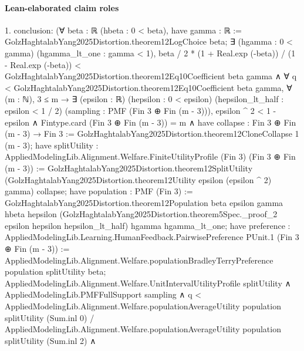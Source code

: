 \documentclass[10pt]{article}
\begin{document}
\paragraph{Lean-elaborated claim roles}\begin{ReviewVerbatim}
1. conclusion: (∀ {beta : ℝ} (hbeta : 0 < beta),
    have gamma : ℝ := GolzHaghtalabYang2025Distortion.theorem12LogChoice beta;
    ∃ (hgamma : 0 < gamma) (hgamma_lt_one : gamma < 1),
      beta / 2 * (1 + Real.exp (-beta)) / (1 - Real.exp (-beta)) <
          GolzHaghtalabYang2025Distortion.theorem12Eq10Coefficient beta gamma ∧
        ∀ q < GolzHaghtalabYang2025Distortion.theorem12Eq10Coefficient beta gamma,
          ∀ (m : ℕ),
            3 ≤ m →
              ∃ (epsilon : ℝ) (hepsilon : 0 < epsilon) (hepsilon_lt_half : epsilon < 1 / 2) (sampling :
                PMF (Fin 3 ⊕ Fin (m - 3))),
                epsilon ^ 2 < 1 - epsilon ∧
                  Fintype.card (Fin 3 ⊕ Fin (m - 3)) = m ∧
                    have collapse : Fin 3 ⊕ Fin (m - 3) → Fin 3 :=
                      GolzHaghtalabYang2025Distortion.theorem12CloneCollapse 1 (m - 3);
                    have splitUtility :
                      AppliedModelingLib.Alignment.Welfare.FiniteUtilityProfile (Fin 3) (Fin 3 ⊕ Fin (m - 3)) :=
                      GolzHaghtalabYang2025Distortion.theorem12SplitUtility
                        (GolzHaghtalabYang2025Distortion.theorem12Utility epsilon (epsilon ^ 2) gamma) collapse;
                    have population : PMF (Fin 3) :=
                      GolzHaghtalabYang2025Distortion.theorem12Population beta epsilon gamma hbeta hepsilon
                        (GolzHaghtalabYang2025Distortion.theorem5Spec._proof_2 epsilon hepsilon hepsilon_lt_half) hgamma
                        hgamma_lt_one;
                    have preference :
                      AppliedModelingLib.Learning.HumanFeedback.PairwisePreference PUnit.{1} (Fin 3 ⊕ Fin (m - 3)) :=
                      AppliedModelingLib.Alignment.Welfare.populationBradleyTerryPreference population splitUtility
                        beta;
                    AppliedModelingLib.Alignment.Welfare.UnitIntervalUtilityProfile splitUtility ∧
                      AppliedModelingLib.PMFFullSupport sampling ∧
                        q <
                            AppliedModelingLib.Alignment.Welfare.populationAverageUtility population splitUtility
                                (Sum.inl 0) /
                              AppliedModelingLib.Alignment.Welfare.populationAverageUtility population splitUtility
                                (Sum.inl 2) ∧

\end{ReviewVerbatim}
\end{document}
